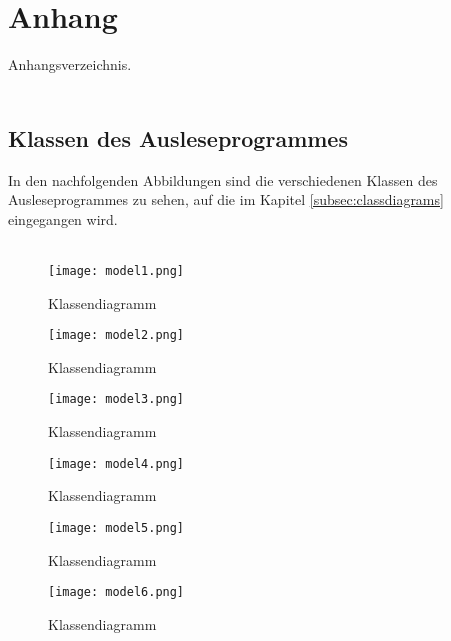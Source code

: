 \chapter{Anhang}
\label{cha:anh}
\captionsetup{list=false}

Anhangsverzeichnis.\\\\

\clearpage

\section*{Klassen des Ausleseprogrammes}
\label{sec:anh:class}

In den nachfolgenden Abbildungen sind die verschiedenen Klassen des Ausleseprogrammes zu sehen, auf die im Kapitel \ref{subsec:classdiagrams} eingegangen wird.\\\\

\begin{figure}[H]
\centering
\texttt{[image: model1.png]}
\caption[]{Klassendiagramm}
\label{fig:classdia1}
\end{figure}

\begin{figure}[H]
\centering
\texttt{[image: model2.png]}
\caption[]{Klassendiagramm}
\label{fig:classdia2}
\end{figure}

\begin{figure}[H]
\centering
\texttt{[image: model3.png]}
\caption[]{Klassendiagramm}
\label{fig:classdia3}
\end{figure}

\begin{figure}[H]
\centering
\texttt{[image: model4.png]}
\caption[]{Klassendiagramm}
\label{fig:classdia4}
\end{figure}

\begin{figure}[H]
\centering
\texttt{[image: model5.png]}
\caption[]{Klassendiagramm}
\label{fig:classdia5}
\end{figure}

\begin{figure}[H]
\centering
\texttt{[image: model6.png]}
\caption[]{Klassendiagramm}
\label{fig:classdia6}
\end{figure}

\clearpage

